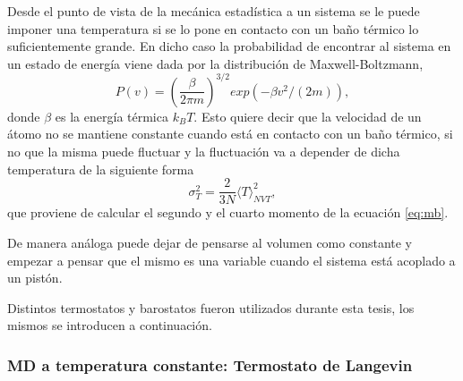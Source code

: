 Desde el punto de vista de la mecánica estadística a un sistema se le puede 
imponer una temperatura si se lo pone en contacto con un baño térmico lo 
suficientemente grande. En dicho caso la probabilidad de encontrar al sistema en
un estado de energía viene dada por la distribución de Maxwell-Boltzmann,
\begin{equation}\label{eq:mb}
P(v) = \left( \frac{\beta}{2\pi m} \right)^{3/2} exp(-\beta v^2 / (2m)),
\end{equation}
donde $\beta$ es la energía térmica $k_BT$. Esto quiere decir que la velocidad de
un átomo no se mantiene constante cuando está en contacto con un baño térmico, si 
no que la misma puede fluctuar y la fluctuación va a depender de dicha temperatura
de la siguiente forma
\begin{equation*}
\sigma_T^2 = \frac{2}{3 N} \langle T \rangle_{NVT}^2,
\end{equation*}
que proviene de calcular el segundo y el cuarto momento de la ecuación \ref{eq:mb}.

De manera análoga puede dejar de pensarse al volumen como constante y empezar a
pensar que el mismo es una variable cuando el sistema está acoplado a un pistón.

Distintos termostatos y barostatos fueron utilizados durante esta tesis, los mismos 
se introducen a continuación.

\subsubsection{MD a temperatura constante: Termostato de Langevin}

